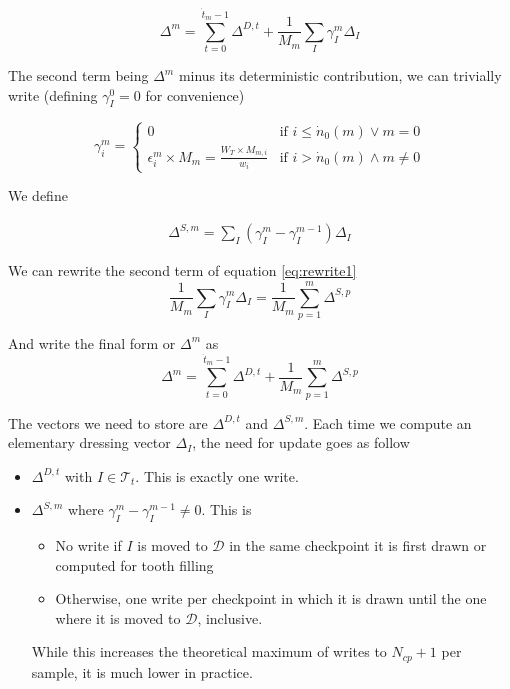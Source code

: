 \documentclass[./thesis.tex]{subfiles}
\begin{document}
\begin{equation}
\label{eq:rewrite1}
\Delta^{m} = \sum_{t=0}^{\dot t_m - 1} \Delta^{D,t}+ \frac{1}{M_m} \sum_{I} \gamma^m_{I} \Delta_I
\end{equation}

The second term being $\Delta^m$ minus its deterministic contribution, we can trivially write (defining $\gamma^ 0_I=0$ for convenience)

\begin{equation}
\gamma^m_i = 
\begin{cases}
0 & \text{if } i \leq \dot n_0(m) \vee m=0 \\
\epsilon^m_i \times M_m = \frac{W_T \times M_{m,i}}{w_i} & \text{if } i > \dot n_0(m) \wedge m \neq 0
\end{cases}
\end{equation}

We define

\begin{align}
\Delta^{S,m} = \sum_I (\gamma^m_I - \gamma^{m-1}_I) \Delta_I
\end{align}


We can rewrite the second term of equation \ref{eq:rewrite1}
\begin{equation}
\frac{1}{M_m}\sum_{I} \gamma^m_{I} \Delta_I = \frac{1}{M_m} \sum_{p=1}^m \Delta^{S,p}
\end{equation}

And write the final form or $\Delta^m$ as
\begin{equation}
\Delta^m=\sum_{t=0}^{\dot t_{m}-1} \Delta^{D,t} + \frac{1}{M_m} \sum_{p=1}^m \Delta^{S,p}
\end{equation}

The vectors we need to store are $\Delta^{D,t}$ and $\Delta^{S,m}$. Each time we compute an elementary dressing vector $\Delta_I$, the need for update goes as follow

\begin{itemize}
\item
$\Delta^{D,t}$ with $I \in \mathcal{T}_t$. This is exactly one write.
\item
$\Delta^{S,m}$ where $\gamma^m_I - \gamma^{m-1}_I \neq 0$. This is
 \begin{itemize}
 \item
 	No write if $I$ is moved to $\mathcal{D}$ in the same checkpoint it is first drawn or computed for tooth filling
 \item
 	Otherwise, one write per checkpoint in which it is drawn until the one where it is moved to $\mathcal{D}$, inclusive.
 \end{itemize}
 While this increases the theoretical maximum of writes to $N_{cp}+1$ per sample, it is much lower in practice.
\end{itemize}
\end{document}

